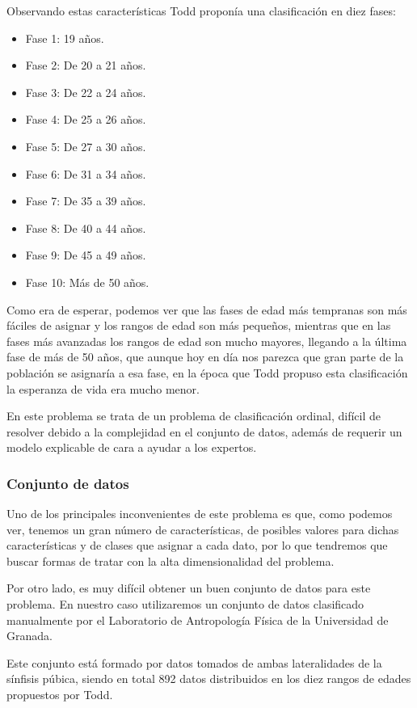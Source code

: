Observando estas características Todd proponía una clasificación en diez fases:

\begin{itemize}
	\item Fase 1: 19 años.
	\item Fase 2: De 20 a 21 años.
	\item Fase 3: De 22 a 24 años.
	\item Fase 4: De 25 a 26 años.
	\item Fase 5: De 27 a 30 años.
	\item Fase 6: De 31 a 34 años.
	\item Fase 7: De 35 a 39 años.
	\item Fase 8: De 40 a 44 años.
	\item Fase 9: De 45 a 49 años.
	\item Fase 10: Más de 50 años.
\end{itemize}

Como era de esperar, podemos ver que las fases de edad más tempranas son más fáciles de asignar y los rangos de edad son más pequeños, mientras que en las fases más avanzadas los rangos de edad son mucho mayores, llegando a la última fase de más de 50 años, que aunque hoy en día nos parezca que gran parte de la población se asignaría a esa fase, en la época que Todd propuso esta clasificación la esperanza de vida era mucho menor.

En este problema se trata de un problema de clasificación ordinal, difícil de resolver debido a la complejidad en el conjunto de datos, además de requerir un modelo explicable de cara a ayudar a los expertos.

\subsubsection{Conjunto de datos}

Uno de los principales inconvenientes de este problema es que, como podemos ver, tenemos un gran número de características, de posibles valores para dichas características y de clases que asignar a cada dato, por lo que tendremos que buscar formas de tratar con la alta dimensionalidad del problema.

Por otro lado, es muy difícil obtener un buen conjunto de datos para este problema. En nuestro caso utilizaremos un conjunto de datos clasificado manualmente por el Laboratorio de Antropología Física de la Universidad de Granada\cite{laboratorioForenseUGR}.

Este conjunto está formado por datos tomados de ambas lateralidades de la sínfisis púbica, siendo en total 892 datos distribuidos en los diez rangos de edades propuestos por Todd.

